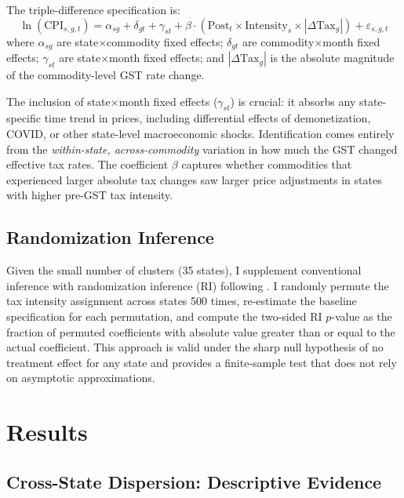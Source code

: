 \documentclass[12pt]{article}
\begin{document}
The triple-difference specification is:
\begin{equation}\label{eq:triplediff}
\ln(\text{CPI}_{s,g,t}) = \alpha_{sg} + \delta_{gt} + \gamma_{st} + \beta \cdot (\text{Post}_t \times \text{Intensity}_s \times |\Delta\text{Tax}_g|) + \varepsilon_{s,g,t}
\end{equation}
where $\alpha_{sg}$ are state$\times$commodity fixed effects; $\delta_{gt}$ are commodity$\times$month fixed effects; $\gamma_{st}$ are state$\times$month fixed effects; and $|\Delta\text{Tax}_g|$ is the absolute magnitude of the commodity-level GST rate change.

The inclusion of state$\times$month fixed effects ($\gamma_{st}$) is crucial: it absorbs any state-specific time trend in prices, including differential effects of demonetization, COVID, or other state-level macroeconomic shocks. Identification comes entirely from the \textit{within-state, across-commodity} variation in how much the GST changed effective tax rates. The coefficient $\beta$ captures whether commodities that experienced larger absolute tax changes saw larger price adjustments in states with higher pre-GST tax intensity.

\subsection{Randomization Inference}

Given the small number of clusters (35 states), I supplement conventional inference with randomization inference (RI) following \citet{young2019channeling}. I randomly permute the tax intensity assignment across states 500 times, re-estimate the baseline specification for each permutation, and compute the two-sided RI $p$-value as the fraction of permuted coefficients with absolute value greater than or equal to the actual coefficient. This approach is valid under the sharp null hypothesis of no treatment effect for any state and provides a finite-sample test that does not rely on asymptotic approximations.


\section{Results}\label{sec:results}

\subsection{Cross-State Dispersion: Descriptive Evidence}
\end{document}
